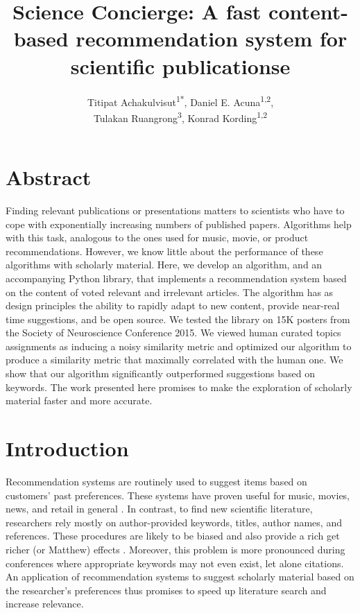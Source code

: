 \documentclass[a4paper]{article}
\title{Science Concierge: A fast content-based recommendation system for scientific publicationse}
\author{Titipat Achakulvisut\textsuperscript{1*}, Daniel E. Acuna\textsuperscript{1,2}, \\  Tulakan Ruangrong\textsuperscript{3}, Konrad Kording\textsuperscript{1,2}}
\begin{document}
\maketitle

\section{Abstract}

Finding relevant publications or presentations matters to scientists who have to cope with exponentially increasing numbers of published papers. Algorithms help with this task, analogous to the ones used for music, movie, or product recommendations. However, we know little about the performance of these algorithms with scholarly material. Here, we develop an algorithm, and an accompanying Python library, that implements a recommendation system based on the content of voted relevant and irrelevant articles. The algorithm has as design principles the ability to rapidly adapt to new content, provide near-real time suggestions, and be open source. We tested the library on 15K posters from the Society of Neuroscience Conference 2015. We viewed human curated topics assignments as inducing a noisy similarity metric and optimized our algorithm to produce a similarity metric that maximally correlated with the human one. We show that our algorithm significantly outperformed suggestions based on keywords.  The work presented here promises to make the exploration of scholarly material faster and more accurate.

\section{Introduction}

Recommendation systems are routinely used to suggest items based on customers’ past preferences. These systems have proven useful for music, movies, news, and retail in general \cite{manning2008introduction}. In contrast, to find new scientific literature, researchers rely mostly on author-provided keywords, titles, author names, and references. These procedures are likely to be biased \cite{chavalarias2010science} and also provide a rich get richer (or Matthew) effects \cite{petersen2011quantitative}. Moreover, this problem is more pronounced during conferences where appropriate keywords may not even exist, let alone citations. An application of recommendation systems to suggest scholarly material based on the researcher’s preferences thus promises to speed up literature search and increase relevance.
\end{document}
